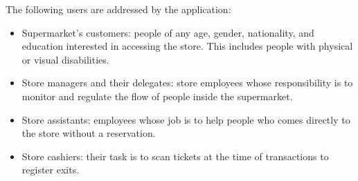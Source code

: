 \documentclass[../../main.tex]{subfiles}
\begin{document}
	The following users are addressed by the application:
	\begin{itemize}
		\item Supermarket's customers: people of any age, gender, nationality, and education interested in accessing the store. This includes people with physical or visual disabilities.
		\item Store managers and their delegates: store employees whose responsibility is to monitor and regulate the flow of people inside the supermarket.
		\item Store assistants: employees whose job is to help people who comes directly to the store without a reservation.
		\item Store cashiers: their task is to scan tickets at the time of transactions to register exits.
	\end{itemize}
\end{document}
